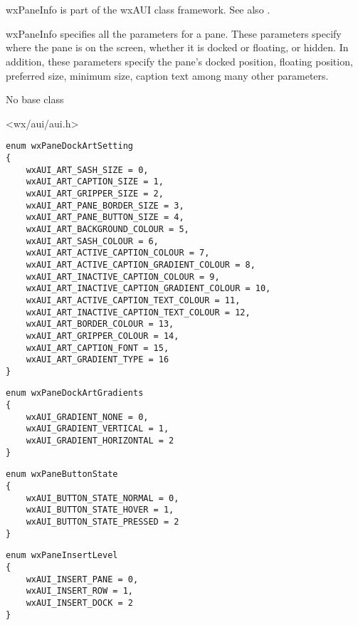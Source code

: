 \section{}\label{wxpaneinfo}

wxPaneInfo is part of the wxAUI class framework.
See also .

wxPaneInfo specifies all the parameters for a pane.
These parameters specify where the pane is on the
screen, whether it is docked or floating, or hidden.
In addition, these parameters specify the pane's
docked position, floating position, preferred size,
minimum size, caption text among many other parameters.


No base class


<wx/aui/aui.h>




\begin{verbatim}
enum wxPaneDockArtSetting
{
    wxAUI_ART_SASH_SIZE = 0,
    wxAUI_ART_CAPTION_SIZE = 1,
    wxAUI_ART_GRIPPER_SIZE = 2,
    wxAUI_ART_PANE_BORDER_SIZE = 3,
    wxAUI_ART_PANE_BUTTON_SIZE = 4,
    wxAUI_ART_BACKGROUND_COLOUR = 5,
    wxAUI_ART_SASH_COLOUR = 6,
    wxAUI_ART_ACTIVE_CAPTION_COLOUR = 7,
    wxAUI_ART_ACTIVE_CAPTION_GRADIENT_COLOUR = 8,
    wxAUI_ART_INACTIVE_CAPTION_COLOUR = 9,
    wxAUI_ART_INACTIVE_CAPTION_GRADIENT_COLOUR = 10,
    wxAUI_ART_ACTIVE_CAPTION_TEXT_COLOUR = 11,
    wxAUI_ART_INACTIVE_CAPTION_TEXT_COLOUR = 12,
    wxAUI_ART_BORDER_COLOUR = 13,
    wxAUI_ART_GRIPPER_COLOUR = 14,
    wxAUI_ART_CAPTION_FONT = 15,
    wxAUI_ART_GRADIENT_TYPE = 16
}
\end{verbatim}

\begin{verbatim}
enum wxPaneDockArtGradients
{
    wxAUI_GRADIENT_NONE = 0,
    wxAUI_GRADIENT_VERTICAL = 1,
    wxAUI_GRADIENT_HORIZONTAL = 2
}
\end{verbatim}

\begin{verbatim}
enum wxPaneButtonState
{
    wxAUI_BUTTON_STATE_NORMAL = 0,
    wxAUI_BUTTON_STATE_HOVER = 1,
    wxAUI_BUTTON_STATE_PRESSED = 2
}
\end{verbatim}

\begin{verbatim}
enum wxPaneInsertLevel
{
    wxAUI_INSERT_PANE = 0,
    wxAUI_INSERT_ROW = 1,
    wxAUI_INSERT_DOCK = 2
}
\end{verbatim}

